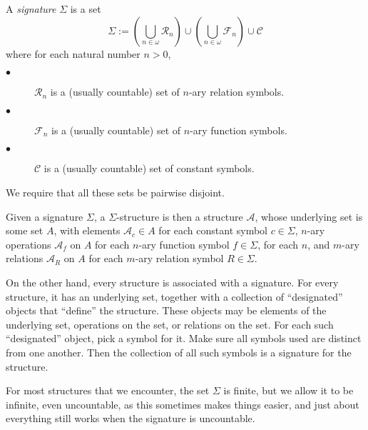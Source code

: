 \documentclass[12pt]{article}
\begin{document}
A \emph{signature} $\Sigma$ is a set 
\begin{displaymath}
\Sigma:=\left(\bigcup_{n\in\omega}\mathcal{R}_n\right)\cup\left(\bigcup_{n\in\omega}\mathcal{F}_n
\right)\cup\mathcal{C}
\end{displaymath}
where for each natural number $n>0$, 
\begin{description}
\item[$\bullet$] $\mathcal{R}_n$ is a (usually countable) set of $n$-ary relation symbols.
\item[$\bullet$] $\mathcal{F}_n$ is a (usually countable) set of $n$-ary function symbols.
\item[$\bullet$] $\mathcal{C}$ is a (usually countable) set of constant symbols.
\end{description}

We require that all these sets be pairwise disjoint.

Given a signature $\Sigma$, a $\Sigma$-structure is then a structure $\mathcal{A}$, whose underlying set is some set $A$, with elements $\mathcal{A}_c \in A$ for each constant symbol $c\in \Sigma$, $n$-ary operations $\mathcal{A}_f$ on $A$ for each $n$-ary function symbol $f\in \Sigma$, for each $n$, and $m$-ary relations $\mathcal{A}_R$ on $A$ for each $m$-ary relation symbol $R\in \Sigma$.

On the other hand, every structure is associated with a signature.  For every structure, it has an underlying set, together with a collection of ``designated'' objects that ``define'' the structure.  These objects may be elements of the underlying set, operations on the set, or relations on the set.  For each such ``designated'' object, pick a symbol for it.  Make sure all symbols used are distinct from one another.  Then the collection of all such symbols is a signature for the structure.

For most structures that we encounter, the set $\Sigma$ is finite, but we allow it to be infinite, even uncountable, as this sometimes makes things easier, and just about everything still works when the signature is uncountable.
\end{document}
